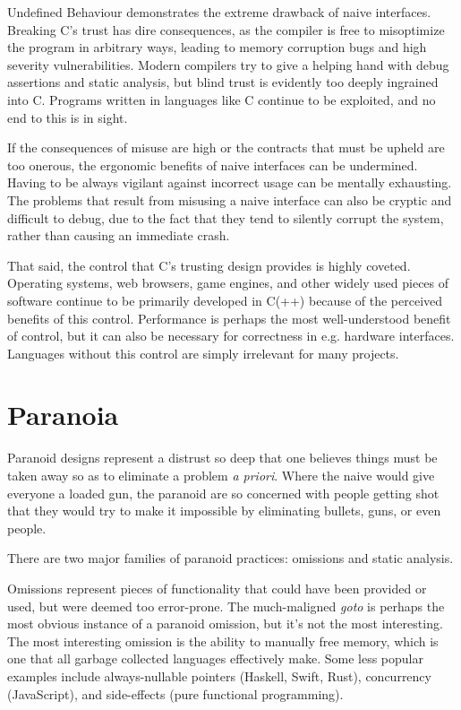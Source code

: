 Undefined Behaviour demonstrates the extreme drawback of naive interfaces.
Breaking C's trust has dire consequences, as the compiler is free to misoptimize
the program in arbitrary ways, leading to memory corruption bugs and high
severity vulnerabilities. Modern compilers try to give a helping hand with debug
assertions and static analysis, but blind trust is evidently too deeply
ingrained into C. Programs written in languages like C continue to be exploited,
and no end to this is in sight.

If the consequences of misuse are high or the contracts that must be upheld are
too onerous, the ergonomic benefits of naive interfaces can be undermined.
Having to be always vigilant against incorrect usage can be mentally exhausting.
The problems that result from misusing a naive interface can also be cryptic and
difficult to debug, due to the fact that they tend to silently corrupt the system,
rather than causing an immediate crash.

That said, the control that C's trusting design provides is highly coveted.
Operating systems, web browsers, game engines, and other widely used pieces of
software continue to be primarily developed in C(++) because of the perceived
benefits of this control. Performance is perhaps the most well-understood benefit
of control, but it can also be necessary for correctness in e.g. hardware
interfaces. Languages without this control are simply irrelevant for many projects.





\section{Paranoia}

Paranoid designs represent a distrust so deep that one believes things must be
taken away so as to eliminate a problem \emph{a priori}. Where the naive would give
everyone a loaded gun, the paranoid are so concerned with people getting shot
that they would try to make it impossible by eliminating bullets, guns, or even
people.

There are two major families of paranoid practices: omissions and static analysis.

Omissions represent pieces of functionality that could have been provided or
used, but were deemed too error-prone. The much-maligned \emph{goto} is perhaps
the most obvious instance of a paranoid omission, but it's not the most
interesting. The most interesting omission is the ability to manually free memory,
which is one that all garbage collected languages effectively make.
Some less popular examples include always-nullable pointers (Haskell, Swift, Rust),
concurrency (JavaScript), and side-effects (pure functional programming).

